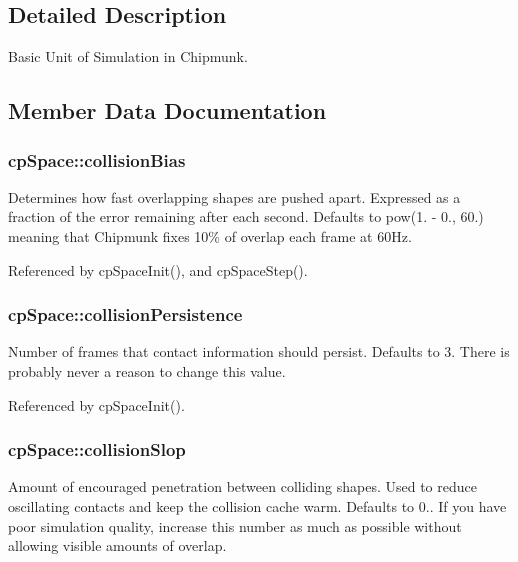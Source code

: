 \subsection{Detailed Description}
Basic Unit of Simulation in Chipmunk. 

\subsection{Member Data Documentation}
\hypertarget{structcp_space_a8f5a7d2a5cf25b1f18d05e9b31a87ad9}{
\subsubsection[{collision\-Bias}]{ {\bf cp\-Space\-::collision\-Bias}}}\label{structcp_space_a8f5a7d2a5cf25b1f18d05e9b31a87ad9}
Determines how fast overlapping shapes are pushed apart. Expressed as a fraction of the error remaining after each second. Defaults to pow(1. -\/ 0., 60.) meaning that Chipmunk fixes 10\% of overlap each frame at 60\-Hz. 

Referenced by cp\-Space\-Init(), and cp\-Space\-Step().

\hypertarget{structcp_space_a3bd0012d98c276bd903b1635b9756396}{
\subsubsection[{collision\-Persistence}]{ {\bf cp\-Space\-::collision\-Persistence}}}\label{structcp_space_a3bd0012d98c276bd903b1635b9756396}
Number of frames that contact information should persist. Defaults to 3. There is probably never a reason to change this value. 

Referenced by cp\-Space\-Init().

\hypertarget{structcp_space_af1bec644a24e12bfc642a942a88520f7}{
\subsubsection[{collision\-Slop}]{ {\bf cp\-Space\-::collision\-Slop}}}\label{structcp_space_af1bec644a24e12bfc642a942a88520f7}
Amount of encouraged penetration between colliding shapes. Used to reduce oscillating contacts and keep the collision cache warm. Defaults to 0.. If you have poor simulation quality, increase this number as much as possible without allowing visible amounts of overlap. 

